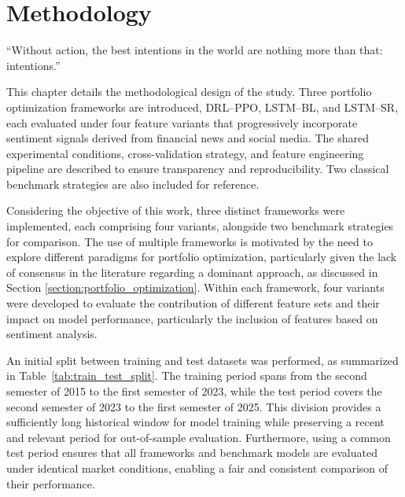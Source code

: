 \chapter{Methodology}
\label{chapter:methods}


\begin{introduction}
\begin{flushright}
``Without action, the best intentions in the world are nothing more than that: intentions.''
\end{flushright}

\vspace{0.5em}

This chapter details the methodological design of the study. Three portfolio optimization frameworks are introduced, DRL--PPO, LSTM--BL, and LSTM--SR, each evaluated under four feature variants that progressively incorporate sentiment signals derived from financial news and social media. The shared experimental conditions, cross-validation strategy, and feature engineering pipeline are described to ensure transparency and reproducibility. Two classical benchmark strategies are also included for reference.
\end{introduction}


Considering the objective of this work, three distinct frameworks were implemented, each comprising four variants, alongside two benchmark strategies for comparison. The use of multiple frameworks is motivated by the need to explore different paradigms for portfolio optimization, particularly given the lack of consensus in the literature regarding a dominant approach, as discussed in Section \ref{section:portfolio_optimization}. Within each framework, four variants were developed to evaluate the contribution of different feature sets and their impact on model performance, particularly the inclusion of features based on sentiment analysis.

An initial split between training and test datasets was performed, as summarized in Table~\ref{tab:train_test_split}. The training period spans from the second semester of 2015 to the first semester of 2023, while the test period covers the second semester of 2023 to the first semester of 2025. This division provides a sufficiently long historical window for model training while preserving a recent and relevant period for out-of-sample evaluation. Furthermore, using a common test period ensures that all frameworks and benchmark models are evaluated under identical market conditions, enabling a fair and consistent comparison of their performance.

